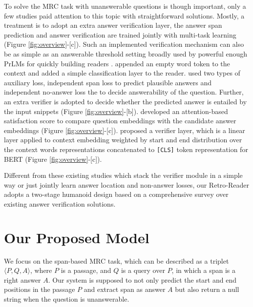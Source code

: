 \documentclass[letterpaper]{article} %
\begin{document}
To solve the MRC task with unanswerable questions is though important, only a few studies paid attention to this topic with straightforward solutions.
Mostly, a treatment is to adopt an extra answer verification layer, the answer span prediction and answer verification are trained jointly with multi-task learning (Figure \ref{fig:overview}-[c]). Such an implemented verification mechanism can also be as simple as an answerable threshold setting broadly used by powerful enough PrLMs for quickly building readers \cite{devlin2018bert,zhang2019semantics}.
\citeauthor{liu2018stochastic}  appended an empty word token to the context and added a simple classification layer to the reader. %
\citeauthor{hu2019read}  used two types of auxiliary loss, independent span loss to predict plausible answers and independent no-answer loss the to decide answerability of the question. Further, an extra verifier is adopted to decide whether the predicted answer is entailed by the input snippets (Figure \ref{fig:overview}-[b]).
\citeauthor{back2020neurquri}  developed an attention-based satisfaction score to compare question embeddings with the candidate answer embeddings (Figure \ref{fig:overview}-[c]). %
\citeauthor{zhang2019sg}  proposed a verifier layer, which is
a linear layer applied to context embedding weighted by start and end distribution over the context words representations concatenated to \texttt{[CLS]} token representation for BERT (Figure \ref{fig:overview}-[c]).


Different from these existing studies which stack the verifier module in a simple way or just jointly learn answer location and non-answer losses, our Retro-Reader adopts a two-stage humanoid design \cite{DBLP:conf/sigir/ZhengMLYZM19,doi:10.1080/00461520.1987.9653053} based on a comprehensive survey over existing answer verification solutions.

\section{Our Proposed Model}
We focus on the span-based MRC task, which can be described as a triplet $\langle P, Q, A \rangle$, where $P$ is a passage, and $Q$ is a query over $P$, in which a span is a right answer $A$. Our system is supposed to not only predict the start and end positions in the passage $P$ and extract span as answer $A$ but also return a null string when the question is unanswerable.
\end{document}
